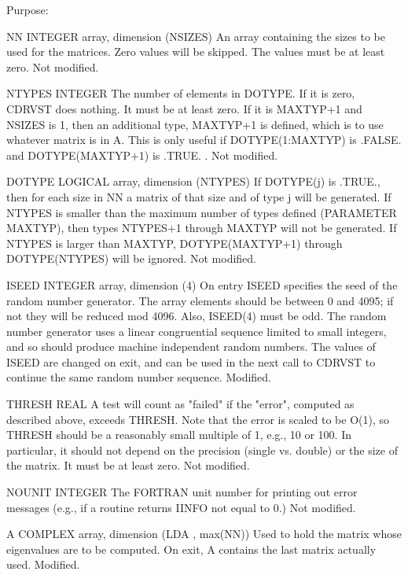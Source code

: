 \begin{DoxyParagraph}{Purpose\+: }
\begin{DoxyVerb}
  NN      INTEGER array, dimension (NSIZES)
          An array containing the sizes to be used for the matrices.
          Zero values will be skipped.  The values must be at least
          zero.
          Not modified.

  NTYPES  INTEGER
          The number of elements in DOTYPE.   If it is zero, CDRVST
          does nothing.  It must be at least zero.  If it is MAXTYP+1
          and NSIZES is 1, then an additional type, MAXTYP+1 is
          defined, which is to use whatever matrix is in A.  This
          is only useful if DOTYPE(1:MAXTYP) is .FALSE. and
          DOTYPE(MAXTYP+1) is .TRUE. .
          Not modified.

  DOTYPE  LOGICAL array, dimension (NTYPES)
          If DOTYPE(j) is .TRUE., then for each size in NN a
          matrix of that size and of type j will be generated.
          If NTYPES is smaller than the maximum number of types
          defined (PARAMETER MAXTYP), then types NTYPES+1 through
          MAXTYP will not be generated.  If NTYPES is larger
          than MAXTYP, DOTYPE(MAXTYP+1) through DOTYPE(NTYPES)
          will be ignored.
          Not modified.

  ISEED   INTEGER array, dimension (4)
          On entry ISEED specifies the seed of the random number
          generator. The array elements should be between 0 and 4095;
          if not they will be reduced mod 4096.  Also, ISEED(4) must
          be odd.  The random number generator uses a linear
          congruential sequence limited to small integers, and so
          should produce machine independent random numbers. The
          values of ISEED are changed on exit, and can be used in the
          next call to CDRVST to continue the same random number
          sequence.
          Modified.

  THRESH  REAL
          A test will count as "failed" if the "error", computed as
          described above, exceeds THRESH.  Note that the error
          is scaled to be O(1), so THRESH should be a reasonably
          small multiple of 1, e.g., 10 or 100.  In particular,
          it should not depend on the precision (single vs. double)
          or the size of the matrix.  It must be at least zero.
          Not modified.

  NOUNIT  INTEGER
          The FORTRAN unit number for printing out error messages
          (e.g., if a routine returns IINFO not equal to 0.)
          Not modified.

  A       COMPLEX array, dimension (LDA , max(NN))
          Used to hold the matrix whose eigenvalues are to be
          computed.  On exit, A contains the last matrix actually
          used.
          Modified.


\end{DoxyVerb}
\end{DoxyParagraph}
